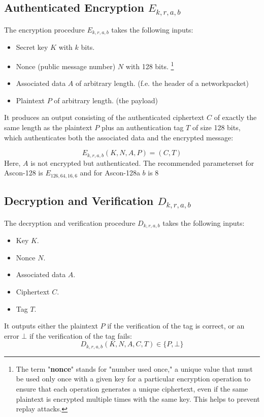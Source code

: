 \subsection{Authenticated Encryption $E_{k,r,a,b}$}
The encryption procedure $E_{k,r,a,b}$ takes the following inputs:
\begin{itemize}
    \item Secret key $K$ with $k$ bits.
    \item Nonce (public message number) $N$ with 128 bits. \footnote[2]{The term "\textbf{nonce}" stands for "number used once," a unique value that must be used only once with a given key for a particular encryption operation to ensure that each operation generates a unique ciphertext, even if the same plaintext is encrypted multiple times with the same key. This helps to prevent replay attacks.}
    \item Associated data $A$ of arbitrary length. (f.e. the header of a networkpacket)
    \item Plaintext $P$ of arbitrary length. (the payload)
\end{itemize}
It produces an output consisting of the authenticated ciphertext $C$ of exactly the same length as the plaintext $P$ plus an authentication tag $T$ of size 128 bits, which authenticates both the associated data and the encrypted message:

\[
E_{k,r,a,b}(K,N,A,P) = (C,T)
\]
Here, $A$ is not encrypted but authenticated. 
The recommended parameterset for Ascon-128 is $E_{126,64,16,6}$ and for Ascon-128a $b$ is 8 \cite{Ascon-v1.2}


\subsection{Decryption and Verification $D_{k,r,a,b}$}
The decryption and verification procedure $D_{k,r,a,b}$ takes the following inputs:
\begin{itemize}
    \item Key $K$.
    \item Nonce $N$.
    \item Associated data $A$.
    \item Ciphertext $C$.
    \item Tag $T$.
\end{itemize}
It outputs either the plaintext $P$ if the verification of the tag is correct, or an error $\bot$ if the verification of the tag fails:
\[
D_{k,r,a,b}(K,N,A,C,T) \in \{P, \bot\}
\]
\cite{Ascon-v1.2}

